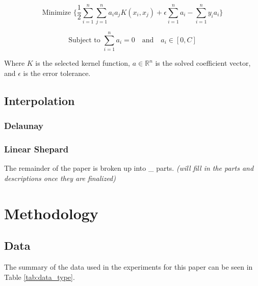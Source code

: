 \documentclass{scspaperproc}
\theoremstyle{scsthe}
\begin{document}
$$ \text{Minimize } \bigg\{ \frac{1}{2}\sum_{i=1}^{n}\sum_{j=1}^{n}
a_i a_j K(x_i, x_j) + \epsilon \sum_{i=1}^{n} a_i - \sum_{i=1}^{n} y_i
a_i \bigg\} $$

$$ \text{Subject to } \sum_{i=1}^{n}a_i = 0 \text{ } \text{ and }
\text{ } a_i \in [0,C] $$

Where $K$ is the selected kernel function, $a \in \mathbb{R}^n$ is the
solved coefficient vector, and $\epsilon$ is the error tolerance. 

\subsection{Interpolation}
\subsubsection{Delaunay}
\subsubsection{Linear Shepard}

The remainder of the paper is broken up into \_ parts. \textit{(will
  fill in the parts and descriptions once they are finalized)}



\section{Methodology}
\subsection{Data}
The summary of the data used in the experiments for this paper can be
seen in Table \ref{tab:data_type}.
\end{document}
